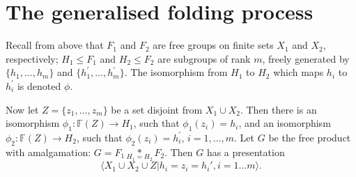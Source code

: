 \documentclass[a4paper,12pt]{article}
\numberwithin{equation}{section}
\numberwithin{figure}{section}
\newcommand{\FF}{\ensuremath{\mathbb{F}}}
\newcommand{\la}{\langle}
\newcommand{\ra}{\rangle}
\newcommand{\maps}{\rightarrow}
\begin{document}
\section{The generalised folding process}\label{sec:foldings}

Recall from above that $F_1$ and $F_2$ are free groups on finite sets
$X_1$ and $X_2$, respectively;
 $H_1 \leq F_1$ and $H_2 \leq F_2$ are subgroups of rank $m$, freely
generated by $\{h_1,\ldots, h_m\}$ and $\{h_1^\prime,\ldots ,h_m^\prime\}$.
The isomorphism from $H_1$ to $H_2$ which maps $h_i$ to $h_i^\prime$ is
denoted $\phi$.

Now let
$Z=\{z_1,\ldots, z_m\}$ be a set disjoint from $X_1\cup X_2$. Then there
is an isomorphism $\phi_1:\FF(Z)\maps H_1$, such that $\phi_1(z_i)=h_i$,
 and an isomorphism $\phi_2:\FF(Z)\maps H_2$, such that $\phi_2(z_i)
=h_i^\prime$, $i=1,\ldots, m$.
 Let $G$ be the free product with amalgamation:
${G = F_1 \underset{H_1=H_2}{\ast} F_2}$.  Then $G$ has a
 presentation
\[\la X_1\cup X_2\cup Z  | h_i =z_i= h_i', i=1 \ldots m\ra.\]
\end{document}
